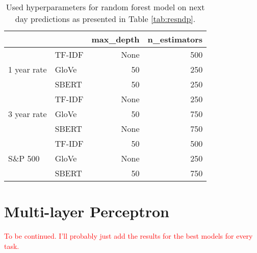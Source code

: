 \begin{table}[H]
    \centering
    \begin{tabular}{llrr}
          & & \textbf{max\_depth} & \textbf{n\_estimators} \\
         \hline \hline
         \multirow{3}{*}{1 year rate} & TF-IDF & None & 500   \\
         & GloVe & 50 & 250    \\
         & SBERT & 50 & 250   \\
         \hline 
         \multirow{3}{*}{3 year rate} & TF-IDF & None & 250   \\
         & GloVe & 50 & 750 \\
         & SBERT & None & 750 \\
         \hline 
         \multirow{3}{*}{S\&P 500} & TF-IDF & 50 & 500 \\
         & GloVe & None & 250 \\
         & SBERT & 50 & 750 \\
         \hline 
    \end{tabular}
    \caption{Used hyperparameters for random forest model on next day predictions as presented in Table \ref{tab:resndp}.}
    \label{tab:rf_hyper_nd}
\end{table}



\section{Multi-layer Perceptron}

\textcolor{red}{To be continued. I'll probably just add the results for the best models for every task. }